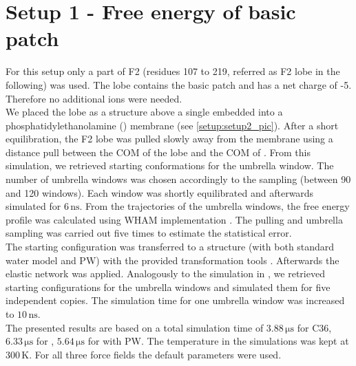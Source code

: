 \section{Setup 1 - Free energy of basic patch}
\label{setup:setup1}
For this setup only a part of F2 (residues 107 to 219, referred as F2 lobe in the following) was used. The lobe contains the basic patch and has a net charge of -5. Therefore no additional ions were needed.\\
We placed the lobe as a \charmm{} structure above a single \pip{} embedded into a phosphatidylethanolamine (\pope{}) membrane (see \autoref{setup:setup2_pic}). After a short equilibration, the F2 lobe was pulled slowly away from the membrane using a distance pull between the COM of the lobe and the COM of \pip{}. From this simulation, we retrieved starting conformations for the umbrella window. The number of umbrella windows was chosen accordingly to the sampling (between 90 and 120 windows). Each window was shortly equilibrated and afterwards simulated for $6\,\si{\nano\second}$.  From the trajectories of the umbrella windows, the free energy profile was calculated using \gromacs{} WHAM implementation \autocite{gromacsWHAM}. The pulling and umbrella sampling was carried out five times to estimate the statistical error.\\
The starting configuration was transferred to a \martini{} structure (with both standard water model and PW) with the provided transformation tools \autocite{backwardpy}. Afterwards the elastic network was applied. Analogously to the simulation in \charmm{}, we retrieved starting configurations for the umbrella windows and simulated them for five independent copies. The simulation time for one umbrella window was increased to $10\,\si{\nano\second}$.\\
The presented results are based on a total simulation time of $3.88\,\si{\micro\second}$ for C36, $6.33\,\si{\micro\second}$ for \martini{}, $5.64\,\si{\micro\second}$ for \martini{} with PW. The temperature in the simulations was kept at $300\,\si{\kelvin}$. For all three force fields the default parameters were used.
%
%
%
